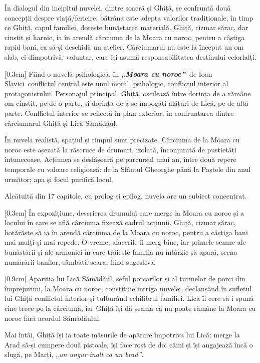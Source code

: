 \documentclass[
12pt,
a4paper
]{article}
\newcommand{\operatitle}{\textbf{\textit{„Moara cu noroc”\ }}} %
\newcommand{\operaauthor}{Ioan Slavici\ }                               %
\begin{document}
În dialogul din incipitul nuvelei, dintre soacră și Ghiță, se confruntă două concepții despre viață/fericire: bătrâna este adepta valorilor tradiționale, în timp ce Ghiță, capul familiei, dorește bunăstarea materială. Ghiță, cizmar sărac, dar cinstit și harnic, ia în arendă cârciuma de la Moara cu noroc, pentru a câștiga rapid bani, ca să-și deschidă un atelier. Cârciumarul nu este la început un om slab, ci dimpotrivă, voluntar, care își asumă responsabilitatea destinului celorlalți.

[0.3cm]
Fiind o nuvelă psihologică, în \operatitle de \operaauthor conflictul central este unul moral, psihologic, conflictul interior al protagonistului. Personajul principal, Ghiță, oscilează între dorința de a rămâne om cinstit, pe de o parte, și dorința de a se îmbogăți alături de Lică, pe de altă parte. Conflictul interior se reflectă în plan exterior, în confruntarea dintre cârciumarul Ghiță și Lică Sămădăul.

În nuvela realistă, spațiul și timpul sunt precizate. Cârciuma de la Moara cu noroc este așezată la răscruce de drumuri, izolată, înconjurată de pustietăți întunecoase. Acțiunea se desfășoară pe parcursul unui an, între două repere temporale cu valoare religioasă: de la Sfântul Gheorghe până la Paștele din anul următor; apa și focul purifică locul.

Alcătuită din 17 capitole, cu prolog și epilog, nuvela are un subiect concentrat.

[0.3cm]
În expozițiune, descrierea drumului care merge la Moara cu noroc și a locului în care se află cârciuma fixează cadrul acțiunii. Ghiță, cizmar sărac, hotărăște să ia în arendă cârciuma de la Moara cu noroc, pentru a câștiga bani mai mulți și mai repede. O vreme, afacerile îi merg bine, iar primele semne ale bunăstării și ale armoniei în care trăiește familia nu întârzie să apară, scena numărării banilor, sâmbătă seara, fiind sugestivă.

[0.9cm]
Apariția lui Lică Sămădăul, șeful porcarilor și al turmelor de porci din împrejurimi, la Moara cu noroc, constituie intriga nuvelei, declanșând în sufletul lui Ghiță conflictul interior și tulburând echilibrul familiei. Lică îi cere să-i spună cine trece pe la cârciumă, iar Ghiță își dă seama că nu poate rămâne la Moara cu noroc fără acordul Sămădăului.

Mai întâi, Ghiță își ia toate măsurile de apărare împotriva lui Lică: merge la Arad să-și cumpere două pistoale, își face rost de doi câini și își angajează încă o slugă, pe Marți, \textit{„un ungur înalt ca un brad”}.
\end{document}
